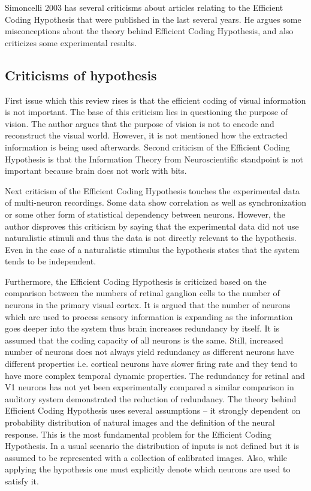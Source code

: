 \documentclass[twoside]{article}
\begin{document}
\begin{multicols}{2}
Simoncelli 2003 has several criticisms about articles relating to the Efficient Coding Hypothesis that were published in the last several years. He argues some misconceptions about the theory behind Efficient Coding Hypothesis, and also criticizes some experimental results.

\subsection{Criticisms of hypothesis}

First issue which this review rises is that the efficient coding of visual information is not important. The base of this criticism lies in questioning the purpose of vision. The author argues that the purpose of vision is not to encode and reconstruct the visual world. However, it is not mentioned how the extracted information is being used afterwards. 
Second criticism of the Efficient Coding Hypothesis is that the Information Theory from Neuroscientific standpoint is not important because brain does not work with bits. 

Next criticism of the Efficient Coding Hypothesis touches the experimental data of multi-neuron recordings. Some data show correlation as well as synchronization or some other form of statistical dependency between neurons.  However, the author disproves this criticism by saying that the experimental data did not use naturalistic stimuli and thus the data is not directly relevant to the hypothesis. Even in the case of a naturalistic stimulus the hypothesis states that the system tends to be independent. 

Furthermore, the Efficient Coding Hypothesis is criticized based on the comparison between the numbers of retinal ganglion cells to the number of neurons in the primary visual cortex. It is argued that the number of neurons which are used to process sensory information is expanding as the information goes deeper into the system thus brain increases redundancy by itself.  It is assumed that the coding capacity of all neurons is the same. Still, increased number of neurons does not always yield redundancy as different neurons have different properties i.e. cortical neurons have slower firing rate and they tend to have more complex temporal dynamic properties. The redundancy for retinal and V1 neurons has not yet been experimentally compared a similar comparison in auditory system demonstrated the reduction of redundancy. 
The theory behind Efficient Coding Hypothesis uses several assumptions – it strongly dependent on probability distribution of natural images and the definition of the neural response.  This is the most fundamental problem for the Efficient Coding Hypothesis. In a usual scenario the distribution of inputs is not defined but it is assumed to be represented with a collection of calibrated images. Also, while applying the hypothesis one must explicitly denote which neurons are used to satisfy it. 


\end{multicols}
\end{document}

